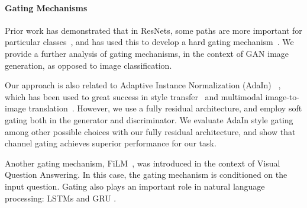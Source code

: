 \paragraph{Gating Mechanisms}
Prior work has demonstrated that in ResNets, some paths are more important for particular classes~\cite{veit2016residual}, and has used this to develop a hard gating mechanism~\cite{veit2018adaptive}.
We provide a further analysis of gating mechanisms, in the context of GAN image generation, as opposed to image classification.

Our approach is also related to Adaptive Instance Normalization (AdaIn) ~\cite{huang2017arbitrary}, which has been used to great success in style transfer~\cite{huang2017arbitrary} and multimodal image-to-image translation~\cite{huang2018multimodal}.
However, we use a fully residual architecture, and employ soft gating both in the generator and discriminator. 
We evaluate AdaIn style gating among other possible choices with our fully residual architecture, and show that channel gating achieves superior performance for our task.

Another gating mechanism, FiLM~\cite{perez2017film}, was introduced in the context of Visual Question Answering.
In this case, the gating mechanism is conditioned on the input question.
Gating also plays an important role in natural language processing: LSTMs \cite{hochreiter1997long} and GRU \cite{cho2014learning}.




